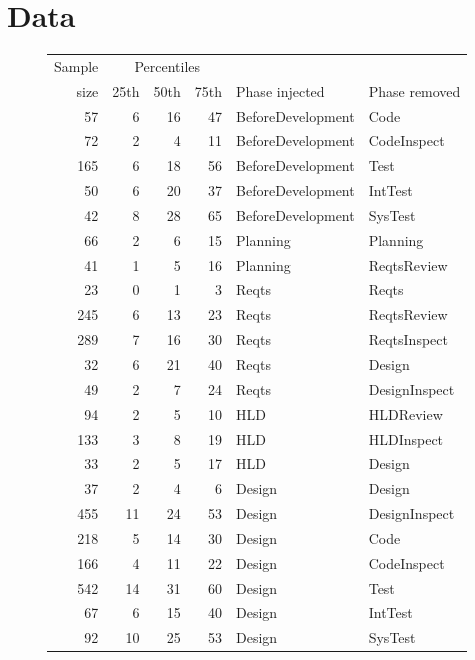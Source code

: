 \documentclass{sig-alternate}
\def\baselinestretch{1}
\begin{document}
\section{Data}
















\begin{figure}[!t]

\renewcommand{\baselinestretch}{0.7}
\scriptsize
\begin{center}
\begin{tabular}{r|rrr|ll}
  Sample&\multicolumn{3}{c|}{Percentiles}\\ 
size & 25th & 50th & 75th & Phase injected & Phase removed\\\hline
57& 6& 16& 47&  BeforeDevelopment&Code\\
72& 2& 4& 11&  BeforeDevelopment&CodeInspect\\
165& 6& 18& 56&  BeforeDevelopment&Test\\
50& 6& 20& 37&  BeforeDevelopment&IntTest\\
42& 8& 28& 65&  BeforeDevelopment&SysTest\\\hline

66& 2& 6& 15&  Planning&Planning\\
41& 1& 5& 16&  Planning&ReqtsReview\\\hline

23& 0& 1& 3&  Reqts&Reqts\\
245& 6& 13& 23&  Reqts&ReqtsReview\\
289& 7& 16& 30&  Reqts&ReqtsInspect\\
32& 6& 21& 40&  Reqts&Design\\
49& 2& 7& 24&  Reqts&DesignInspect\\\hline
 

94& 2& 5& 10&  HLD&HLDReview\\
133& 3& 8& 19&  HLD&HLDInspect\\
33& 2& 5& 17&  HLD&Design\\\hline



37& 2& 4& 6&  Design&Design\\
455& 11& 24& 53&  Design&DesignInspect\\
218& 5& 14& 30&  Design&Code\\
166& 4& 11& 22&  Design&CodeInspect\\
542& 14& 31& 60&  Design&Test\\
67& 6& 15& 40&  Design&IntTest\\
92& 10& 25& 53&  Design&SysTest\\\hline


\end{tabular}
\end{center}
\end{figure}
\end{document}

